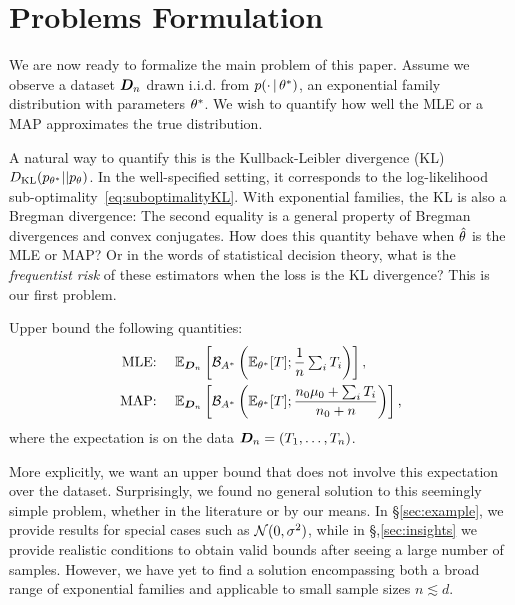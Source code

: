 \section{Problems Formulation}
\label{sec:problem}

We are now ready to formalize the main problem of this paper. Assume we observe a dataset ${\bm{D}}_n$ drawn i.i.d. from $p(\cdot \,\vert\,\theta^*)$, an exponential family distribution
with parameters $\theta^*$.
We wish to quantify how well the MLE or a MAP approximates the true distribution.

A natural way to quantify this is the Kullback-Leibler divergence (KL) $D_{\mathrm{KL}}(p_{\theta^*} || p_\theta)$. %
In the well-specified setting, it corresponds to the log-likelihood sub-optimality~\eqref{eq:suboptimalityKL}.
With exponential families, the KL is also a Bregman divergence:
The second equality is a general property of Bregman divergences and convex conjugates. %
How does this quantity behave when $\hat {\theta}$ is the MLE or MAP?
 Or in the words of statistical decision theory, what is the \emph{frequentist risk} of these estimators when the loss is the KL divergence?
This is our first problem.

\begin{problem}
Upper bound the following quantities:
\begin{align}
	\label{eq:bregmanMLE}
	\text{MLE: } \quad &\expect[\mD_n]{\bregmanconj \left (\E_{\nat^*} [T] ;  \inv{n}  \smallsum_i T_i \right )}, \\
	\label{eq:bregmanMAP}
	\text{MAP: } \quad &\expect[\mD_n]{\bregmanconj \left (\E_{\nat^*} [T] ; \frac{n_0 \m_0 + \smallsum_i T_i}{n_0+n} \right )},
\end{align}
where the expectation is on the data ${\bm{D}}_n = (T_1, \dots, T_n)$.
\end{problem}

More explicitly, we want an upper bound that does not involve this expectation over the dataset.
Surprisingly, we found no general solution to this seemingly simple problem, whether in the literature or by our means.
In \S\ref{sec:example}, we provide results for special cases such as ${\mathcal N}(0, \sigma^2)$,
while in \S,\ref{sec:insights} we provide realistic conditions to obtain valid bounds after seeing a large number of samples.
However, we have yet to find a solution encompassing both a broad range of exponential families
and applicable to small sample sizes $n \lesssim d$.

